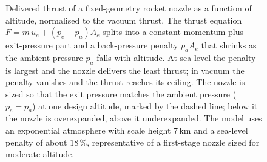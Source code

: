 \begin{figure}[htbp]
\centering
{}
\caption[Rocket-nozzle thrust against altitude]{Delivered thrust of a
fixed-geometry rocket nozzle as a function of altitude, normalised to
the vacuum thrust. The thrust equation $F = \dot m\,u_e + (p_e - p_a)
A_e$ splits into a constant momentum-plus-exit-pressure part and a
back-pressure penalty $p_a A_e$ that shrinks as the ambient pressure
$p_a$ falls with altitude. At sea level the penalty is largest and the
nozzle delivers the least thrust; in vacuum the penalty vanishes and
the thrust reaches its ceiling. The nozzle is sized so that the exit
pressure matches the ambient pressure ($p_e = p_a$) at one design
altitude, marked by the dashed line; below it the nozzle is
overexpanded, above it underexpanded. The model uses an exponential
atmosphere with scale height $7\,\si{\kilo\meter}$ and a sea-level
penalty of about $18\,\%$, representative of a first-stage nozzle sized
for moderate altitude.}
\label{fig:vol03ch13:nozzle-thrust-altitude}
\end{figure}
